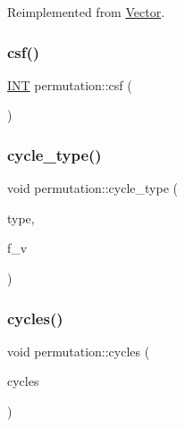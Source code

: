 Reimplemented from \mbox{\hyperlink{class_vector_af657307f3d344c8cef5d633335a5f484}{Vector}}.

\mbox{\label{classpermutation_a121bb8f936f6e1e4101ef59d04c3998a}} 
\subsubsection{\texorpdfstring{csf()}{csf()}}
{\footnotesize\ttfamily \mbox{\hyperlink{galois_8h_a09fddde158a3a20bd2dcadb609de11dc}{I\+NT}} permutation\+::csf (\begin{DoxyParamCaption}{ }\end{DoxyParamCaption})}

\mbox{\label{classpermutation_a5509600cbe40b5c6cdaff56d822b4de0}} 
\subsubsection{\texorpdfstring{cycle\+\_\+type()}{cycle\_type()}}
{\footnotesize\ttfamily void permutation\+::cycle\+\_\+type (\begin{DoxyParamCaption}\item[{\mbox{\hyperlink{class_vector}{Vector}} \&}]{type,  }\item[{\mbox{\hyperlink{galois_8h_a09fddde158a3a20bd2dcadb609de11dc}{I\+NT}}}]{f\+\_\+v }\end{DoxyParamCaption})}

\mbox{\label{classpermutation_a88706cf2c683df70a29156f39b3e4895}} 
\subsubsection{\texorpdfstring{cycles()}{cycles()}}
{\footnotesize\ttfamily void permutation\+::cycles (\begin{DoxyParamCaption}\item[{\mbox{\hyperlink{class_vector}{Vector}} \&}]{cycles }\end{DoxyParamCaption})}

\mbox{\label{classpermutation_aefa5da43419a02c9cc0030715f8aa233}} 
